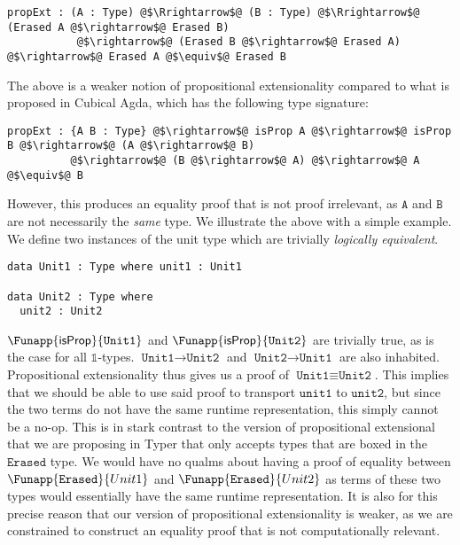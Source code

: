 \documentclass[12pt,twoside,maitrise]{dms}
\theoremstyle{definition}
\numberwithin{equation}{section}
\numberwithin{table}{chapter}
\numberwithin{figure}{chapter}
\newcommand\kw[1] {\textsf{#1}}
\newcommand\id[1] {\texttt{#1}}
\begin{document}
\begin{verbatim}
propExt : (A : Type) @$\Rrightarrow$@ (B : Type) @$\Rrightarrow$@ (Erased A @$\rightarrow$@ Erased B)
           @$\rightarrow$@ (Erased B @$\rightarrow$@ Erased A) @$\rightarrow$@ Erased A @$\equiv$@ Erased B
\end{verbatim}

The above is a weaker notion of propositional extensionality compared to what is
proposed in Cubical Agda, which has the following type signature:

\begin{verbatim}
propExt : {A B : Type} @$\rightarrow$@ isProp A @$\rightarrow$@ isProp B @$\rightarrow$@ (A @$\rightarrow$@ B)
          @$\rightarrow$@ (B @$\rightarrow$@ A) @$\rightarrow$@ A @$\equiv$@ B
\end{verbatim}

However, this produces an equality proof that is not proof irrelevant, as
$\id{A}$ and $\id{B}$ are not necessarily the \emph{same} type. We illustrate
the above with a simple example. We define two instances of the unit type which
are trivially \emph{logically equivalent}.

\begin{verbatim}
data Unit1 : Type where unit1 : Unit1

data Unit2 : Type where
  unit2 : Unit2
\end{verbatim}

$\Funapp{\kw{isProp}}{\id{Unit1}}$ and $\Funapp{\kw{isProp}}{\id{Unit2}}$ are
trivially true, as is the case for all $\mathbb{1}$-types. $\id{Unit1}
\rightarrow \id{Unit2}$ and $\id{Unit2} \rightarrow \id{Unit1}$ are also
inhabited. Propositional extensionality thus gives us a proof of $\id{Unit1}
\equiv \id{Unit2}$. This implies that we should be able to use said proof to
transport $\id{unit1}$ to $\id{unit2}$, but since the two terms do not have the
same runtime representation, this simply cannot be a no-op. This is in stark
contrast to the version of propositional extensional that we are proposing in
Typer that only accepts types that are boxed in the $\id{Erased}$ type. We would
have no qualms about having a proof of equality between
$\Funapp{\id{Erased}}{Unit1}$ and $\Funapp{\id{Erased}}{Unit2}$ as terms of
these two types would essentially have the same runtime representation. It is
also for this precise reason that our version of propositional extensionality is
weaker, as we are constrained to construct an equality proof that is not
computationally relevant.
\end{document}
